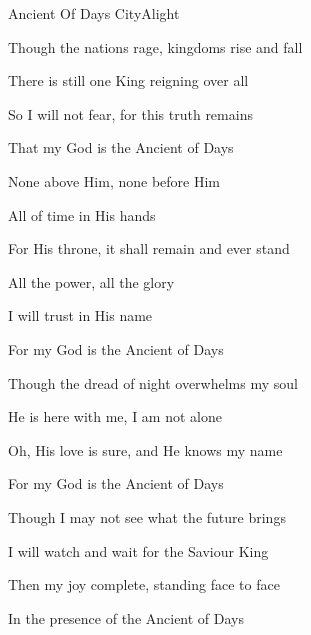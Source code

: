 \documentclass[12pt]{book}
\begin{document}
\begin{song}{Ancient Of Days}{}
  { CityAlight}
  {}
  {}
  {}
  \begin{SBVerse}
    Though the nations rage, kingdoms rise and fall

    There is still one King reigning over all

    So I will not fear, for this truth remains

    That my God is the Ancient of Days
  \end{SBVerse}
  \begin{SBOpGroup}
    None above Him, none before Him

    All of time in His hands

    For His throne, it shall remain and ever stand

    All the power, all the glory

    I will trust in His name

    For my God is the Ancient of Days
  \end{SBOpGroup}
  \begin{SBVerse}
    Though the dread of night overwhelms my soul

    He is here with me, I am not alone

    Oh, His love is sure, and He knows my name

    For my God is the Ancient of Days
  \end{SBVerse}
  \begin{SBVerse}
    Though I may not see what the future brings

    I will watch and wait for the Saviour King

    Then my joy complete, standing face to face

    In the presence of the Ancient of Days
  \end{SBVerse}
\end{song}
\end{document}

